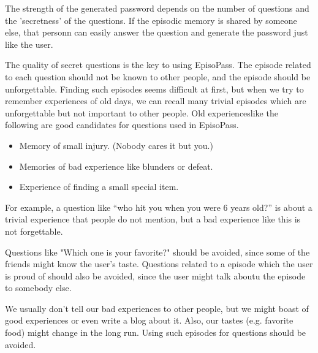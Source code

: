 \documentclass{article}
\begin{document}

The strength of the generated password depends on the number of
questions and the 'secretness' of the questions.
If the episodic memory is shared by someone else,
that personn can easily answer the question and generate the
password just like the user.

The quality of secret questions is the key to using EpisoPass.
The episode related to each question should not be known to other people,
and the episode should be unforgettable.
%
Finding such episodes seems difficult at first, but
when we try to remember experiences of old days,
we can recall many trivial episodes which are unforgettable but
not important to other people.
%
Old experienceslike the following are good candidates for
questions used in EpisoPass.

\begin{itemize}
\item Memory of small injury. (Nobody cares it but you.)

\item Memories of bad experience like blunders or defeat.

\item Experience of finding a small special item.
\end{itemize}

For example, a question like
``who hit you when you were 6 years old?''
is about a trivial experience that people do not mention,
but a bad experience like this is not forgettable.

Questions like "Which one is your favorite?" should be avoided,
since some of the friends might know the user's taste.
Questions related to a episode which the user is proud of should also be
avoided, since the user might talk aboutu the episode to somebody else.

We usually don't tell our bad experiences to other people,
but we might boast of good experiences or even write a blog about it.
Also, our tastes (e.g. favorite food) might change in the long run.
Using such episodes for questions should be avoided.

% 
% 
% 
% 
\end{document}
